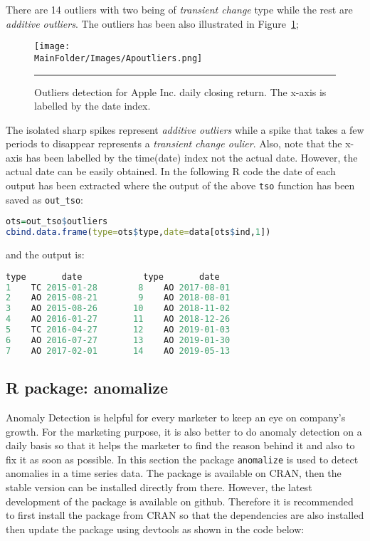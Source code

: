There are 14 outliers with two being of \textit{transient change} type while the rest are \textit{additive outliers}. The outliers has been also illustrated in Figure~\ref{fig:apoutlier}; 
\begin{figure}[t]
\centering
\texttt{[image: \\MainFolder/Images/Apoutliers.png]}
\caption[\small Outliers detection for Apple Inc. daily closing return]{\small Outliers detection for Apple Inc. daily closing return. The x-axis is labelled by the date index.}
\hrule\label{fig:apoutlier}
\end{figure}
\afterpage{\FloatBarrier}
The isolated sharp spikes represent \textit{additive outliers} while a spike that takes a few periods to disappear represents a \textit{transient change oulier}. Also, note that the x-axis has been labelled by the time(date) index not the actual date. However, the actual date can be easily obtained. In the following R code the date of each output has been extracted where the output of the above \verb|tso| function has been saved as \verb|out_tso|:
\begin{lstlisting}[language=R]
ots=out_tso$outliers
cbind.data.frame(type=ots$type,date=data[ots$ind,1])
\end{lstlisting}
and the output is:
\begin{lstlisting}[language=R]
   type       date            type       date
1    TC 2015-01-28        8    AO 2017-08-01
2    AO 2015-08-21        9    AO 2018-08-01
3    AO 2015-08-26       10    AO 2018-11-02  
4    AO 2016-01-27       11    AO 2018-12-26
5    TC 2016-04-27       12    AO 2019-01-03
6    AO 2016-07-27       13    AO 2019-01-30
7    AO 2017-02-01       14    AO 2019-05-13
\end{lstlisting}


\subsection{R package: anomalize} Anomaly Detection is helpful for every marketer to keep an eye on company’s growth. For the marketing purpose, it is also better to do anomaly detection on a daily basis so that it helps the marketer to find the reason behind it and also to fix it as soon as possible. In this section the package \verb|anomalize| is used to detect anomalies in a time series data. The package is available on CRAN, then the stable version can be installed directly from there. However, the latest development of the package is available on github. Therefore it is recommended to first install the package from CRAN so that the dependencies are also installed then update the package using devtools as shown in the code below:

